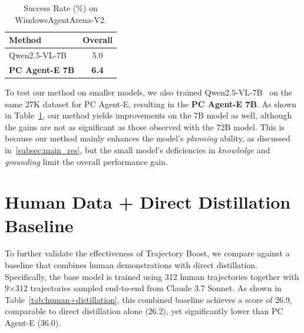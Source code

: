 \documentclass{article} %
\renewcommand{\cite}{\citep}
\begin{document}
\begin{table}
  \vspace{-\baselineskip}
  \centering
  \begin{tabular}{l c}
    \toprule
    \textbf{Method} & \textbf{Overall} \\
    \midrule
    Qwen2.5-VL-7B   & 5.0 \\
    \textbf{PC Agent-E 7B}   & \textbf{6.4} \\
    \bottomrule
  \end{tabular}
  \caption{Success Rate (\%) on WindowsAgentArena-V2.}
  \label{tab:smaller_model}
\end{table}

To test our method on smaller models, we also trained Qwen2.5-VL-7B~\cite{bai2025qwen25vltechnicalreport} on the same 27K dataset for PC Agent-E, resulting in the \textbf{PC Agent-E 7B}. As shown in Table~\ref{tab:smaller_model}, our method yields improvements on the 7B model as well, although the gains are not as significant as those observed with the 72B model. This is because our method mainly enhances the model's \textit{planning} ability, as discussed in~\autoref{subsec:main_res}, but the small model's deficiencies in \textit{knowledge} and \textit{grounding} limit the overall performance gain.

\section{Human Data + Direct Distillation Baseline}
\label{appendixd:human+distill}

To further validate the effectiveness of Trajectory Boost, we compare against a baseline that combines human demonstrations with direct distillation. Specifically, the base model is trained using 312 human trajectories together with 9$\times$312 trajectories sampled end-to-end from Claude 3.7 Sonnet. As shown in Table~\ref{tab:human+distillation}, this combined baseline achieves a score of 26.9, comparable to direct distillation alone (26.2), yet significantly lower than PC Agent-E (36.0).

\begin{table}[h]
\centering
{}
\caption{Comparison with Human Data + Direct Distillation baseline on WindowsAgentArena-V2.}
\label{tab:human+distillation}
\end{table}
\end{document}
